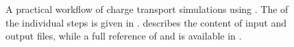 \begin{figure}
\begin{scriptsize}
\end{scriptsize}
\caption{A practical workflow of charge transport simulations using \votcaxtp. The  of the individual steps is given in .  describes the content of input and output files, while a full reference of  and  is available in .  }
\label{fig:summary}
\end{figure}
